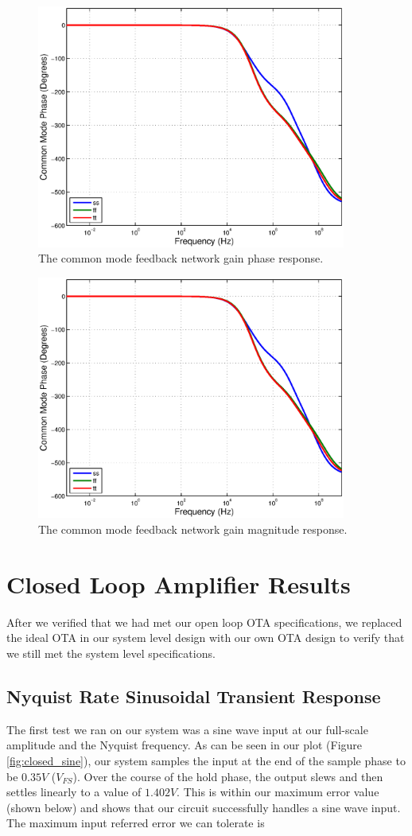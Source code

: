 \documentclass[journal]{IEEEtran}
\begin{document}
\begin{figure}
\centering
\includegraphics[width=4in]{Plots/open_cm_phase.eps}
\caption{The common mode feedback network gain phase response.}
\label{fig:open_cmfb_gain}
\end{figure}

\begin{figure}
\centering
\includegraphics[width=4in]{Plots/open_cm_phase.eps}
\caption{The common mode feedback network gain magnitude response.}
\label{fig:open_cmfb_phase}
\end{figure}


\section{Closed Loop Amplifier Results}
After we verified that we had met our open loop OTA specifications, we replaced the ideal OTA in our system level design with our own OTA design to verify that we still met the system level specifications.

\subsection{Nyquist Rate Sinusoidal Transient Response}
The first test we ran on our system was a sine wave input at our full-scale amplitude and the Nyquist frequency. As can be seen in our plot (Figure \ref{fig:closed_sine}), our system samples the input at the end of the sample phase to be $0.35V$ ($V_{FS}$). Over the course of the hold phase, the output slews and then settles linearly to a value of $1.402V$. This is within our maximum error value (shown below) and shows that our circuit successfully handles a sine wave input. The maximum input referred error we can tolerate is
\end{document}
